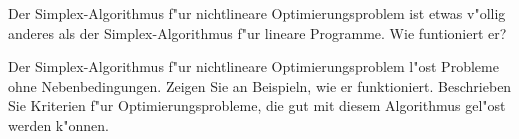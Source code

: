 \begin{aufgabe}
Der Simplex-Algorithmus f"ur nichtlineare Optimierungsproblem ist
etwas
v"ollig anderes als der Simplex-Algorithmus f"ur lineare Programme.
Wie funtioniert er?
\end{aufgabe}

{\parindent 0pt Der Simplex-Algorithmus} f"ur nichtlineare
Optimierungsproblem l"ost Probleme ohne Nebenbedingungen.
Zeigen Sie an Beispieln, wie er funktioniert. Beschrieben
Sie Kriterien f"ur Optimierungsprobleme, die gut mit
diesem Algorithmus gel"ost werden k"onnen.
